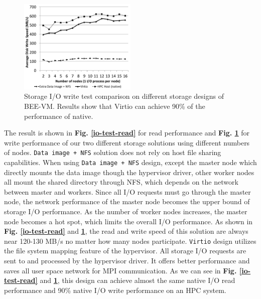 \begin{figure}[h]
    \centering
    \includegraphics[width=0.5\textwidth]{figures/io-write-seq-test.pdf}
    \caption{Storage I/O write test comparison on different storage designs of BEE-VM. Results show that Virtio can achieve 90\% of the performance of native.}
    \label{io-test-write}
\end{figure}

The result is shown in \textbf{Fig. \ref{io-test-read}} for read performance and \textbf{Fig. \ref{io-test-write}} for write performance of our two different storage solutions using different numbers of nodes. \texttt{Data image + NFS} solution does not rely on host file sharing capabilities. When using \texttt{Data image + NFS} design, except the master node which directly mounts the data image though the hypervisor driver, other worker nodes all mount the shared directory through NFS, which depends on the network between master and workers. Since all I/O requests must go through the master node, the network performance of the master node becomes the upper bound of storage I/O performance. As the number of worker nodes increases, the master node becomes a hot spot, which limits the overall I/O performance.  As shown in \textbf{Fig. \ref{io-test-read}} and \textbf{\ref{io-test-write}}, the read and write speed of this solution are always near 120-130 MB/s no matter how many nodes participate. \texttt{Virtio} design utilizes the file system mapping feature of the hypervisor. All storage I/O requests are sent to and processed by the hypervisor driver. It offers better performance and saves all user space network for MPI communication. As we can see in \textbf{Fig. \ref{io-test-read}} and \textbf{\ref{io-test-write}}, this design can achieve almost the same native I/O read performance and 90\% native I/O write performance on an HPC system. 

